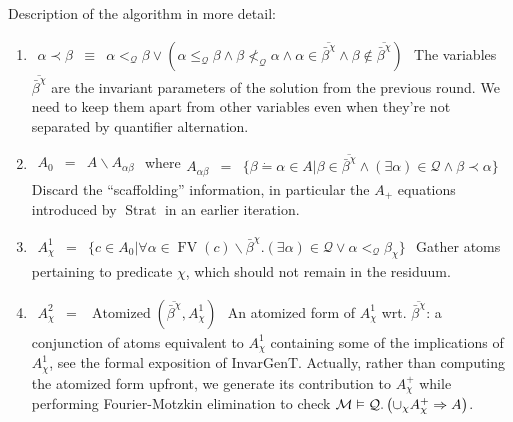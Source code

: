 \documentclass{article}
\newcommand{\nin}{\not\in}
\newcommand{\tmop}[1]{\ensuremath{\operatorname{#1}}}
\begin{document}
Description of the algorithm in more detail:
\begin{enumerate}
  \item $\begin{array}{lll}
    \alpha \prec \beta & \equiv & \alpha <_{\mathcal{Q}} \beta \vee (\alpha
    \leqslant_{\mathcal{Q}} \beta \wedge \beta \nless_{\mathcal{Q}} \alpha
    \wedge \alpha \in \overline{\bar{\beta}^{\chi}} \wedge \beta \nin
    \overline{\bar{\beta}^{\chi}})
  \end{array}$ The variables $\overline{\bar{\beta}^{\chi}}$ are the invariant
  parameters of the solution from the previous round. We need to keep them
  apart from other variables even when they're not separated by quantifier
  alternation.
  
  \item $\begin{array}{lll}
    A_0 & = & A\backslash A_{\alpha \beta}
  \end{array}$ where$\begin{array}{lll}
    A_{\alpha \beta} & = & \{ \beta \dot{=} \alpha \in A | \beta \in
    \overline{\bar{\beta}^{\chi}} \wedge (\exists \alpha) \in \mathcal{Q}
    \wedge \beta \prec \alpha \}
  \end{array}$ Discard the ``scaffolding'' information, in particular the
  $A_+$ equations introduced by $\tmop{Strat}$ in an earlier iteration.
  
  \item $\begin{array}{lll}
    A^1_{\chi} & = & \{ c \in A_0 | \forall \alpha \in \tmop{FV} (c)
    \backslash \bar{\beta}^{\chi} . (\exists \alpha) \in \mathcal{Q} \vee
    \alpha <_{\mathcal{Q}} \beta_{\chi} \}
  \end{array}$ Gather atoms pertaining to predicate $\chi$, which should not
  remain in the residuum.
  
  \item $\begin{array}{lll}
    A^2_{\chi} & = & \tmop{Atomized} (\overline{\bar{\beta}^{\chi}},
    A_{\chi}^1)
  \end{array}$ An atomized form of $A_{\chi}^1$ wrt.
  $\overline{\bar{\beta}^{\chi}}$: a conjunction of atoms equivalent to
  $A_{\chi}^1$ containing some of the implications of $A_{\chi}^1$, see the
  formal exposition of InvarGenT. Actually, rather than computing the atomized
  form upfront, we generate its contribution to $A_{\chi}^+$ while performing
  Fourier-Motzkin elimination to check $\mathcal{M} \vDash \mathcal{Q}. \left(
  \cup_{\chi} A_{\chi}^+ \Rightarrow {\nobreak} A \right)$.
  

\end{enumerate}
\end{document}
